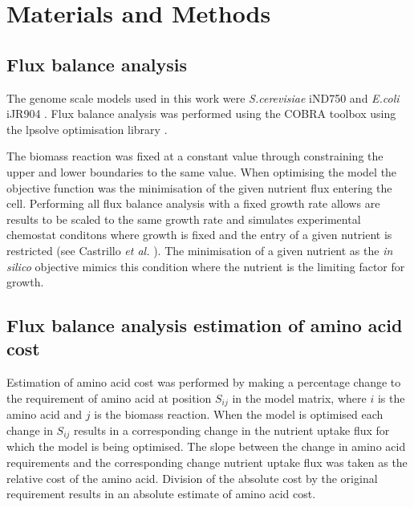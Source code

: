 \clearpage

\section{Materials and Methods}

\subsection{Flux balance analysis}

The genome scale models used in this work were \emph{S.cerevisiae} iND750 \cite{duarte2004a} and \emph{E.coli} iJR904 \cite{reed2003}. Flux balance analysis was performed using the COBRA toolbox \cite{becker2007} using the lpsolve optimisation library \cite{lpsolve}.

The biomass reaction was fixed at a constant value through constraining the upper and lower boundaries to the same value. When optimising the model the objective function was the minimisation of the given nutrient flux entering the cell. Performing all flux balance analysis with a fixed growth rate allows are results to be scaled to the same growth rate and simulates experimental chemostat conditons where growth is fixed and the entry of a given nutrient is restricted (see Castrillo \emph{et al.} \cite{castrillo2007}). The minimisation of a given nutrient as the \emph{in silico} objective mimics this condition where the nutrient is the limiting factor for growth.

\subsection{Flux balance analysis estimation of amino acid cost}

Estimation of amino acid cost was performed by making a percentage change to the requirement of amino acid at position $S_{ij}$ in the model matrix, where $i$ is the amino acid and $j$ is the biomass reaction. When the model is optimised each change in $S_{ij}$ results in a corresponding change in the nutrient uptake flux for which the model is being optimised. The slope between the change in amino acid requirements and the corresponding change nutrient uptake flux was taken as the relative cost of the amino acid. Division of the absolute cost by the original requirement results in an absolute estimate of amino acid cost.

